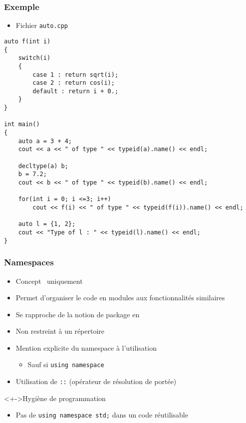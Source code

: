\begin{frame}[containsverbatim]
\frametitle{Exemple}
\begin{itemize}
\item Fichier \texttt{auto.cpp}
\end{itemize}
\begin{lstlisting}
auto f(int i)
{
	switch(i)
	{
		case 1 : return sqrt(i);
		case 2 : return cos(i);
		default : return i + 0.;
	}	
}

int main()
{
	auto a = 3 + 4;
	cout << a << " of type " << typeid(a).name() << endl;

	decltype(a) b; 
	b = 7.2;
	cout << b << " of type " << typeid(b).name() << endl;

	for(int i = 0; i <=3; i++)
		cout << f(i) << " of type " << typeid(f(i)).name() << endl;

	auto l = {1, 2};
	cout << "Type of l : " << typeid(l).name() << endl;
}
\end{lstlisting}
\end{frame}

\begin{frame}
\frametitle{Namespaces}
\begin{itemize}[<+->]
\item Concept \cpp\ uniquement
\item Permet d'organiser le code en modules aux fonctionnalités similaires
\item Se rapproche de la notion de package en \java
\item Non restreint à un répertoire
\item Mention explicite du namespace à l'utilisation
	\begin{itemize}
	\item Sauf si \lstinline|using namespace|
	\end{itemize}
\item Utilisation de \texttt{::} (opérateur de résolution de portée)
\end{itemize}
\begin{block}<+->{Hygiène de programmation}
	\begin{itemize}[<+->]
	\item Pas de \lstinline|using namespace std;| dans un code réutilisable
	\end{itemize}
\end{block}
\end{frame}

